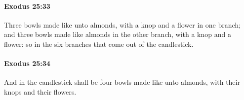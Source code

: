 		\paragraph{Exodus 25:33} %
			\label{EXODUS-25-33}

			Three bowls made like unto almonds, with a knop and a flower in one branch; and three bowls made like almonds in the other branch, with a knop and a flower: so in the six branches that come out of the candlestick.


		\paragraph{Exodus 25:34} %
			\label{EXODUS-25-34}

			And in the candlestick shall be four bowls made like unto almonds, with their knops and their flowers.


